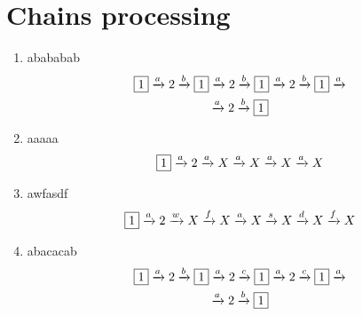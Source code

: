 \documentclass[12pt]{article}
\begin{document}
\section* {Chains processing} 
\begin {enumerate} 
\item abababab
\begin {equation*} 
\begin {gathered} 
\fbox{1} \xrightarrow{a} 2 \xrightarrow{b} \fbox{1} \xrightarrow{a} 2 \xrightarrow{b} \fbox{1} \xrightarrow{a} 2 \xrightarrow{b} \fbox{1} \xrightarrow{a} \\
 \xrightarrow{a} 2 \xrightarrow{b} \fbox{1}
\end {gathered} 
\end {equation*} 

\item aaaaa
\begin {equation*} 
\begin {gathered} 
\fbox{1} \xrightarrow{a} 2 \xrightarrow{a} X \xrightarrow{a} X \xrightarrow{a} X \xrightarrow{a} X
\end {gathered} 
\end {equation*} 

\item awfasdf
\begin {equation*} 
\begin {gathered} 
\fbox{1} \xrightarrow{a} 2 \xrightarrow{w} X \xrightarrow{f} X \xrightarrow{a} X \xrightarrow{s} X \xrightarrow{d} X \xrightarrow{f} X
\end {gathered} 
\end {equation*} 

\item abacacab
\begin {equation*} 
\begin {gathered} 
\fbox{1} \xrightarrow{a} 2 \xrightarrow{b} \fbox{1} \xrightarrow{a} 2 \xrightarrow{c} \fbox{1} \xrightarrow{a} 2 \xrightarrow{c} \fbox{1} \xrightarrow{a} \\
 \xrightarrow{a} 2 \xrightarrow{b} \fbox{1}
\end {gathered} 
\end {equation*} 

\end {enumerate}
\end{document}
